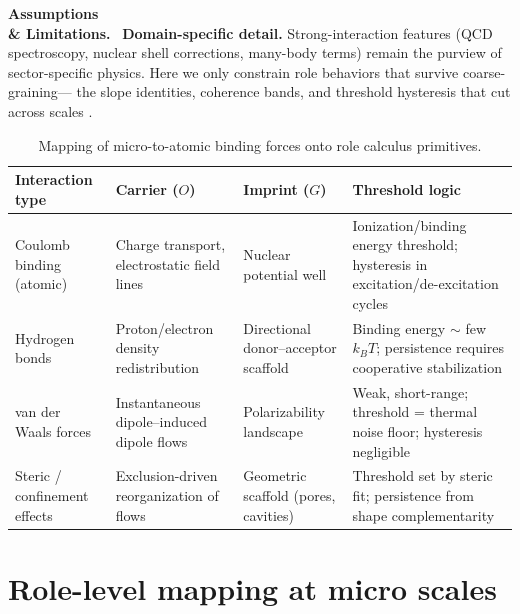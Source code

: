 \documentclass[12pt,a4paper,oneside]{scrreprt}
\newenvironment{limitation}{\par\vspace{0.5em}\noindent\textbf{Assumptions \\ \& Limitations.}\ }{\par\vspace{0.5em}}
\begin{document}
\begin{limitation}
\textbf{Domain-specific detail.} 
Strong-interaction features (QCD spectroscopy, nuclear shell corrections, 
many-body terms) remain the purview of sector-specific physics. 
Here we only constrain role behaviors that survive coarse-graining--- 
the slope identities, coherence bands, and threshold hysteresis 
that cut across scales \citep{Sherrill2010Noncovalent}.
\end{limitation}

\begin{table}[h]
\centering
\caption{Mapping of micro-to-atomic binding forces onto role calculus primitives.}
\begin{tabular}{p{3cm} p{3.5cm} p{3.5cm} p{4cm}}
\toprule
\textbf{Interaction type} & \textbf{Carrier ($O$)} & \textbf{Imprint ($G$)} & \textbf{Threshold logic} \\
\midrule
Coulomb binding (atomic) & Charge transport, electrostatic field lines & Nuclear potential well & Ionization/binding energy threshold; hysteresis in excitation/de-excitation cycles \\
\addlinespace
Hydrogen bonds & Proton/electron density redistribution & Directional donor–acceptor scaffold & Binding energy $\sim$ few $k_BT$; persistence requires cooperative stabilization \\
\addlinespace
van der Waals forces & Instantaneous dipole–induced dipole flows & Polarizability landscape & Weak, short-range; threshold = thermal noise floor; hysteresis negligible \\
\addlinespace
Steric / confinement effects & Exclusion-driven reorganization of flows & Geometric scaffold (pores, cavities) & Threshold set by steric fit; persistence from shape complementarity \\
\bottomrule
\end{tabular}
\end{table}

\section{Role-level mapping at micro scales}\label{sec:micro-mapping}
\end{document}

